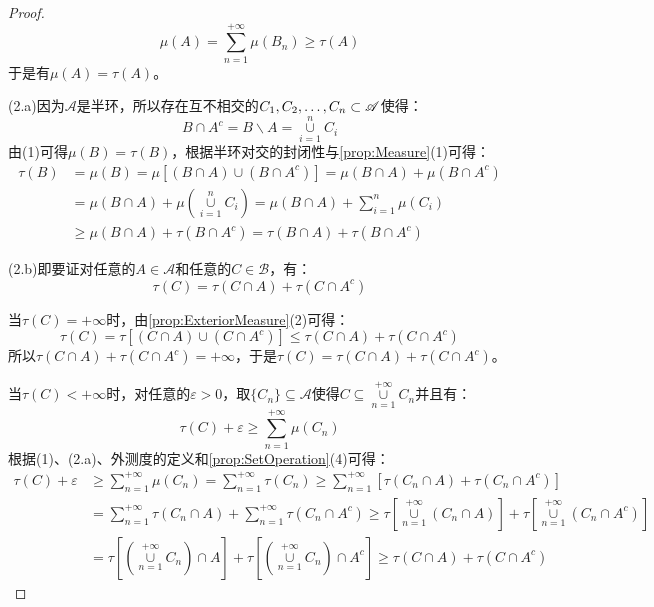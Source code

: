 \begin{proof}
\begin{equation*}
		\mu(A)=\sum_{n=1}^{+\infty}\mu(B_n)\geqslant\tau(A)
	\end{equation*}
	于是有$\mu(A)=\tau(A)$。\par
	(2.a)因为$\mathscr{A}$是半环，所以存在互不相交的$C_1, C_2, \dots, C_{n}\subset\mathscr{A}$使得：
	\begin{equation*}
		B\cap A^c=B\backslash A=\underset{i=1}{\overset{n}{\cup}}C_i
	\end{equation*}
	由(1)可得$\mu(B)=\tau(B)$，根据半环对交的封闭性与\cref{prop:Measure}(1)可得：
	\begin{align*}
		\tau(B)&=\mu(B)=\mu[(B\cap A)\cup (B\cap A^c)]=\mu(B\cap A)+\mu(B\cap A^c) \\
		&=\mu(B\cap A)+\mu\left(\underset{i=1}{\overset{n}{\cup}}C_i\right)=\mu(B\cap A)+\sum_{i=1}^{n}\mu(C_i) \\
		&\geqslant\mu(B\cap A)+\tau(B\cap A^c)=\tau(B\cap A)+\tau(B\cap A^c)
	\end{align*}\par
	(2.b)即要证对任意的$A\in \mathscr{A}$和任意的$C\in \mathscr{B}$，有：
	\begin{equation*}
		\tau(C)=\tau(C\cap A)+\tau(C\cap A^c)
	\end{equation*}\par
	当$\tau(C)=+\infty$时，由\cref{prop:ExteriorMeasure}(2)可得：
	\begin{equation*}
		\tau(C)=\tau[(C\cap A)\cup(C\cap A^c)]\leqslant\tau(C\cap A)+\tau(C\cap A^c)
	\end{equation*}
	所以$\tau(C\cap A)+\tau(C\cap A^c)=+\infty$，于是$\tau(C)=\tau(C\cap A)+\tau(C\cap A^c)$。\par
	当$\tau(C)<+\infty$时，对任意的$\varepsilon>0$，取$\{C_n\}\subseteq\mathscr{A}$使得$C\subseteq\underset{n=1}{\overset{+\infty}{\cup}}C_n$并且有：
	\begin{equation*}
		\tau(C)+\varepsilon\geqslant\sum_{n=1}^{+\infty}\mu(C_n)
	\end{equation*}
	根据(1)、(2.a)、外测度的定义和\cref{prop:SetOperation}(4)可得：
	\begin{align*}
		\tau(C)+\varepsilon&\geqslant\sum_{n=1}^{+\infty}\mu(C_n)=\sum_{n=1}^{+\infty}\tau(C_n)\geqslant\sum_{n=1}^{+\infty}[\tau(C_n\cap A)+\tau(C_n\cap A^c)] \\
		&=\sum_{n=1}^{+\infty}\tau(C_n\cap A)+\sum_{n=1}^{+\infty}\tau(C_n\cap A^c)\geqslant\tau\left[\underset{n=1}{\overset{+\infty}{\cup}}(C_n\cap A)\right]+\tau\left[\underset{n=1}{\overset{+\infty}{\cup}}(C_n\cap A^c)\right] \\
		&=\tau\left[\left(\underset{n=1}{\overset{+\infty}{\cup}}C_n\right)\cap A\right]+\tau\left[\left(\underset{n=1}{\overset{+\infty}{\cup}}C_n\right)\cap A^c\right]\geqslant\tau(C\cap A)+\tau(C\cap A^c)

\end{align*}
\end{proof}
